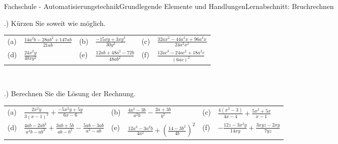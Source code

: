 \documentclass[oneside,openany,headings=optiontotoc,11pt,numbers=noenddot]{scrreprt}
\begin{document}
	\begin{worksheet}{Fachschule - Automatisierungstechnik}{Grundlegende Elemente und Handlungen}{Lernabschnitt: Bruchrechnen}
				
		\noindent
		\begin{framed}
			.) Kürzen Sie soweit wie möglich.\\
			\par\noindent
			\renewcommand{\arraystretch}{1.5}
			\begin{tabularx}{\textwidth}{lXlXlX}
				(a) & \(\frac{14a^2b - 28ab^2 + 147ab}{21ab}\) & (b) & \(\frac{-15xy + 3xy^3}{30y^2}\) & (c) & \(\frac{32ax^2 - 44a^2x + 96a^2x}{24a^2x^2}\)\\
				(d) & \(\frac{24x^2y}{40xy^2}\) & (e) & \(\frac{12ab + 48a^2 - 72b}{48ab^2}\) & (f) & \(\frac{12ac^3 - 24ac^2 + 18a^2c}{(6ac)^2}\)
			\end{tabularx}\\
			\par{}.) Berechnen Sie die Lösung der Rechnung.\\
			\par\noindent
			\begin{tabularx}{\textwidth}{lXlXlX}
				(a) & \(\frac{2x^2y}{3(x-1)^2} + \frac{-5x^2y + 5y}{6x-6}\) & (b) & \(\frac{4a^2 - 3b}{a^2b} - \frac{2a + 3b}{b^2}\) & (c) & \(\frac{4(x^2 - 3)}{4x - 4} + \frac{5x^2 + 5x}{x-1}\)\\
				(d) & \(\frac{4ab - 2ab^2}{a^2b - ab^2} + \frac{3ab + 5b}{ab - b^2} - \frac{5ab - 3ab}{a^2 - ab}\) & (e) & \(\frac{12a^2 - 3a^2b}{4a^2} + (\frac{14 - 3b^2}{4b})^2\) & (f) & \(-\frac{12z - 3x^2y}{14xy} + \frac{3xyz - 2xy}{7yz}\)
			\end{tabularx}\\
		\end{framed}
	\end{worksheet}
\end{document}
